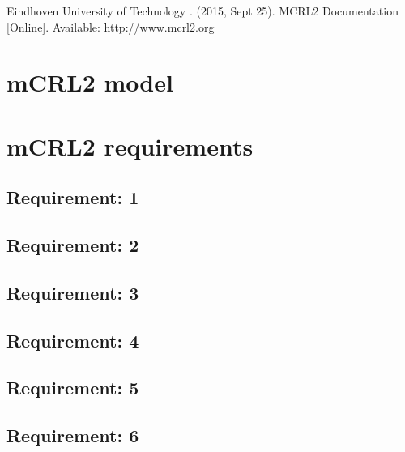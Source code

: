 \documentclass[a4paper,twoside,11pt]{article}
\begin{document}
\begin{thebibliography}{9}
Eindhoven University of Technology . (2015, Sept 25). MCRL2 Documentation [Online]. Available: http://www.mcrl2.org

\end{thebibliography}

\newpage
\begin{appendices}
\section{mCRL2 model} \cbstart
 \cbend

\newpage
\section{mCRL2 requirements}

%	

	\subsection{Requirement: 1}
	
	\subsection{Requirement: 2} \cbstart
	
	\cbend
	\subsection{Requirement: 3} \cbstart
	
	\cbend
	\subsection{Requirement: 4} \cbstart
	
	\cbend
	\subsection{Requirement: 5}
	
	\subsection{Requirement: 6} \cbstart
	
	\cbend

\end{appendices}
\end{document}
